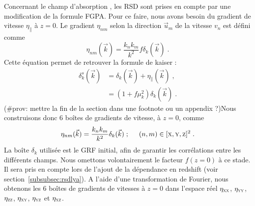 \documentclass[11pt, twoside, a4paper, openright]{report}
\begin{document}
Concernant le champ d'absorption \lya{}, les RSD sont prises en compte par une modification de la formule FGPA. Pour ce faire, nous avons besoin du gradient de vitesse $\eta_{\parallel}$ à $z=0$. Le gradient $\eta_{nm}$ selon la direction $\vec u_m$ de la vitesse $v_n$ est défini comme
\begin{equation}
  \label{eq:eta1}
  \eta_{nm}(\vec k) = \frac{k_n k_m}{k^2} f \delta_k(\vec k) \; .
\end{equation}
Cette équation permet de retrouver la formule de kaiser :
\begin{align}
  \label{eq:kaiser5}
  \delta_k^s(\vec k) &= \delta_k(\vec k) + \eta_{\parallel}(\vec k) \; ,   \\
                     &= (1 + f \mu_k^2) \delta_k(\vec k)  \; .  \nonumber
\end{align}
(\#prov: mettre la fin de la section dans une footnote ou un appendix ?)Nous construisons donc 6 boîtes de gradients de vitesse, à $z=0$, comme
\begin{equation}
  \label{eq:eta2}
  \eta_{nm}(\vec k) = \frac{k_n k_m}{k^2} \delta_k(\vec k) \; ; \hspace{0.5cm} (n,m) \in [\textsc{x}, \textsc{y}, \textsc{z}]^2 \; .
\end{equation}
La boîte $\delta_k$ utilisée est le GRF initial, afin de garantir les corrélations entre les différents champs. Nous omettons volontairement le facteur $f(z=0)$ à ce stade. Il sera pris en compte lors de l'ajout de la dépendance en redshift (voir section~\ref{subsubsec:rsdlya}). A l'aide d'une transformation de Fourier, nous obtenons les 6 boîtes de gradients de vitesses  à $z = 0$ dans l'espace réel $\eta_{\textsc{xx}}$, $\eta_{\textsc{yy}}$, $\eta_{\textsc{zz}}$, $\eta_{\textsc{xy}}$, $\eta_{\textsc{yz}}$ et $\eta_{\textsc{xz}}$.




\end{document}
